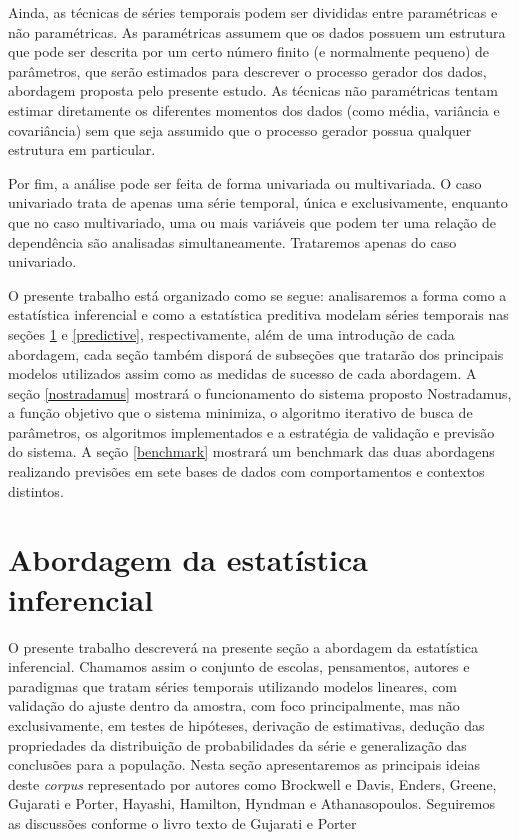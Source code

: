 \documentclass[twocolumn]{rbef}
\newcommand{\1}{\mathbbm{1}}
\begin{document}
Ainda, as técnicas de séries temporais podem ser divididas entre paramétricas e não paramétricas. As paramétricas assumem que os dados possuem um estrutura que pode ser descrita por um certo número finito (e normalmente pequeno) de parâmetros, que serão estimados para descrever o processo gerador dos dados, abordagem proposta pelo presente estudo. As técnicas não paramétricas tentam estimar diretamente os diferentes momentos dos dados (como média, variância e covariância) sem que seja assumido que o processo gerador possua qualquer estrutura em particular.

Por fim, a análise pode ser feita de forma univariada ou multivariada. O caso univariado trata de apenas uma série temporal, única e exclusivamente, enquanto que no caso multivariado, uma ou mais variáveis que podem ter uma relação de dependência são analisadas simultaneamente. Trataremos apenas do caso univariado.


O presente trabalho está organizado como se segue: analisaremos a forma como a estatística inferencial e como a estatística preditiva modelam séries temporais nas seções \ref{inferential} e \ref{predictive}, respectivamente, além de uma introdução de cada abordagem, cada seção também disporá de subseções que tratarão dos principais modelos utilizados assim como as medidas de sucesso de cada abordagem. A seção \ref{nostradamus} mostrará o funcionamento do sistema proposto Nostradamus, a função objetivo que o sistema minimiza, o algoritmo iterativo de busca de parâmetros, os algoritmos implementados e a estratégia de validação e previsão do sistema. A seção \ref{benchmark} mostrará um benchmark das duas abordagens realizando previsões em sete bases de dados com comportamentos e contextos distintos.

\section{Abordagem da estatística inferencial} \label{inferential}

O presente trabalho descreverá na presente seção a abordagem da estatística inferencial. Chamamos assim o conjunto de escolas, pensamentos, autores e paradigmas que tratam séries temporais utilizando modelos lineares, com validação do ajuste dentro da amostra, com foco principalmente, mas não exclusivamente, em testes de hipóteses, derivação de estimativas, dedução das propriedades da distribuição de probabilidades da série e generalização das conclusões para a população. Nesta seção apresentaremos as principais ideias deste \textit{corpus} representado por autores como Brockwell e Davis\cite{Brockwell}, Enders\cite{Enders}, Greene\cite{Greene}, Gujarati e Porter\cite{Gujarati}, Hayashi\cite{Hayashi}, Hamilton\cite{Hamilton}, Hyndman e Athanasopoulos\cite{Hyndman}. Seguiremos as discussões conforme o livro texto de Gujarati e Porter \cite{Gujarati}
\end{document}
